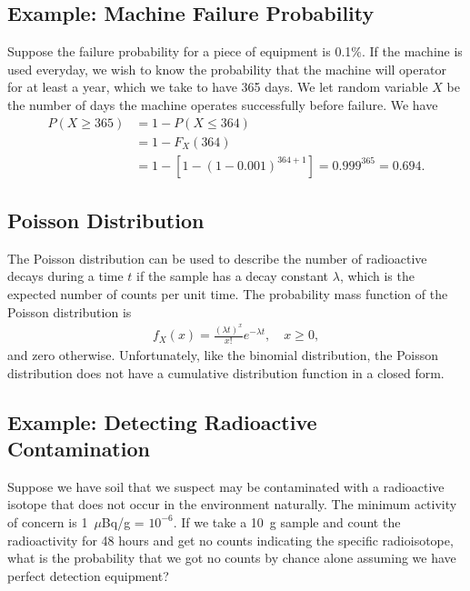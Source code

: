 \subsection{Example: Machine Failure Probability}

Suppose the failure probability for a piece of equipment is 0.1\%. If the machine is used everyday, we wish to know the probability that the machine will operator for at least a year, which we take to have 365 days. We let random variable $X$ be the number of days the machine operates successfully before failure. We have
\begin{align}
  P( X \ge 365 ) &= 1 - P( X \le 364 ) \nonumber \\
  &= 1 - F_X(364) \nonumber \\
  &= 1 - \left[ 1 - ( 1 - 0.001 )^{364+1} \right] = 0.999^{365} = 0.694 .
\end{align}


\subsection{Poisson Distribution}

The Poisson distribution can be used to describe the number of radioactive decays during a time $t$ if the sample has a decay constant $\lambda$, which is the expected number of counts per unit time. The probability mass function of the Poisson distribution is
\begin{align}
  f_X(x) = \frac{(\lambda t)^x}{x!} e^{-\lambda t}, \quad x \ge 0,
\end{align}
and zero otherwise. Unfortunately, like the binomial distribution, the Poisson distribution does not have a cumulative distribution function in a closed form.

\subsection{Example: Detecting Radioactive Contamination}

Suppose we have soil that we suspect may be contaminated with a radioactive isotope that does not occur in the environment naturally. The minimum activity of concern is 1~$\mu$Bq/g = $10^{-6}$. If we take a 10~g sample and count the radioactivity for 48 hours and get no counts indicating the specific radioisotope, what is the probability that we got no counts by chance alone assuming we have perfect detection equipment? 

